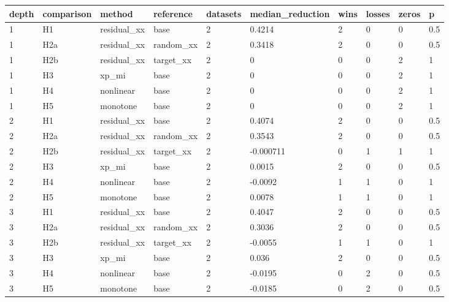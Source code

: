\begin{tabular}{llllllllll}
\toprule
depth & comparison & method & reference & datasets & median\_reduction & wins & losses & zeros & p \\
\midrule
1 & H1 & residual\_xx & base & 2 & 0.4214 & 2 & 0 & 0 & 0.5 \\
1 & H2a & residual\_xx & random\_xx & 2 & 0.3418 & 2 & 0 & 0 & 0.5 \\
1 & H2b & residual\_xx & target\_xx & 2 & 0 & 0 & 0 & 2 & 1 \\
1 & H3 & xp\_mi & base & 2 & 0 & 0 & 0 & 2 & 1 \\
1 & H4 & nonlinear & base & 2 & 0 & 0 & 0 & 2 & 1 \\
1 & H5 & monotone & base & 2 & 0 & 0 & 0 & 2 & 1 \\
2 & H1 & residual\_xx & base & 2 & 0.4074 & 2 & 0 & 0 & 0.5 \\
2 & H2a & residual\_xx & random\_xx & 2 & 0.3543 & 2 & 0 & 0 & 0.5 \\
2 & H2b & residual\_xx & target\_xx & 2 & -0.000711 & 0 & 1 & 1 & 1 \\
2 & H3 & xp\_mi & base & 2 & 0.0015 & 2 & 0 & 0 & 0.5 \\
2 & H4 & nonlinear & base & 2 & -0.0092 & 1 & 1 & 0 & 1 \\
2 & H5 & monotone & base & 2 & 0.0078 & 1 & 1 & 0 & 1 \\
3 & H1 & residual\_xx & base & 2 & 0.4047 & 2 & 0 & 0 & 0.5 \\
3 & H2a & residual\_xx & random\_xx & 2 & 0.3036 & 2 & 0 & 0 & 0.5 \\
3 & H2b & residual\_xx & target\_xx & 2 & -0.0055 & 1 & 1 & 0 & 1 \\
3 & H3 & xp\_mi & base & 2 & 0.036 & 2 & 0 & 0 & 0.5 \\
3 & H4 & nonlinear & base & 2 & -0.0195 & 0 & 2 & 0 & 0.5 \\
3 & H5 & monotone & base & 2 & -0.0185 & 0 & 2 & 0 & 0.5 \\
\bottomrule
\end{tabular}
